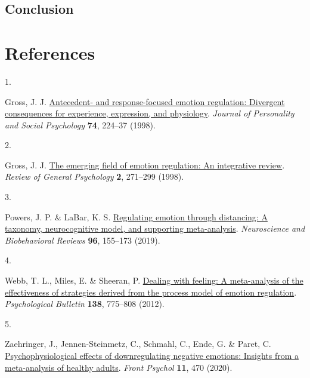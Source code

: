 \documentclass[
  man,floatsintext]{apa6}
\newlength{\cslhangindent}
\newlength{\csllabelwidth}
\newlength{\cslentryspacingunit} %
\newenvironment{CSLReferences}[2] %
 {%
  \setlength{\parindent}{0pt}
  \ifodd #1
  \let\oldpar\par
  \def\par{\hangindent=\cslhangindent\oldpar}
  \fi
  \setlength{\parskip}{#2\cslentryspacingunit}
 }%
 {}
\newcommand{\CSLLeftMargin}[1]{\parbox[t]{\csllabelwidth}{#1}}
\newcommand{\CSLRightInline}[1]{\parbox[t]{\linewidth - \csllabelwidth}{#1}\break}
\begin{document}
\hypertarget{conclusion}{%
\subsection{Conclusion}\label{conclusion}}

\hypertarget{references}{%
\section{References}\label{references}}

\begingroup
\setlength{\parindent}{-0.5in}
\setlength{\leftskip}{0.5in}

\hypertarget{refs}{}
\begin{CSLReferences}{0}{0}
\leavevmode{}%
\CSLLeftMargin{1. }%
\CSLRightInline{Gross, J. J. \href{https://doi.org/10.1037/0022-3514.74.1.224}{Antecedent- and response-focused emotion regulation: Divergent consequences for experience, expression, and physiology}. \emph{Journal of Personality and Social Psychology} \textbf{74}, 224--37 (1998).}

\leavevmode{}%
\CSLLeftMargin{2. }%
\CSLRightInline{Gross, J. J. \href{https://doi.org/10.1037/1089-2680.2.3.271}{The emerging field of emotion regulation: An integrative review}. \emph{Review of General Psychology} \textbf{2}, 271--299 (1998).}

\leavevmode{}%
\CSLLeftMargin{3. }%
\CSLRightInline{Powers, J. P. \& LaBar, K. S. \href{https://doi.org/10.1016/j.neubiorev.2018.04.023}{Regulating emotion through distancing: A taxonomy, neurocognitive model, and supporting meta-analysis}. \emph{Neuroscience and Biobehavioral Reviews} \textbf{96}, 155--173 (2019).}

\leavevmode{}%
\CSLLeftMargin{4. }%
\CSLRightInline{Webb, T. L., Miles, E. \& Sheeran, P. \href{https://doi.org/10.1037/a0027600}{Dealing with feeling: A meta-analysis of the effectiveness of strategies derived from the process model of emotion regulation}. \emph{Psychological Bulletin} \textbf{138}, 775--808 (2012).}

\leavevmode{}%
\CSLLeftMargin{5. }%
\CSLRightInline{Zaehringer, J., Jennen-Steinmetz, C., Schmahl, C., Ende, G. \& Paret, C. \href{https://doi.org/10.3389/fpsyg.2020.00470}{Psychophysiological effects of downregulating negative emotions: Insights from a meta-analysis of healthy adults}. \emph{Front Psychol} \textbf{11}, 470 (2020).}


\end{CSLReferences}
\end{document}
